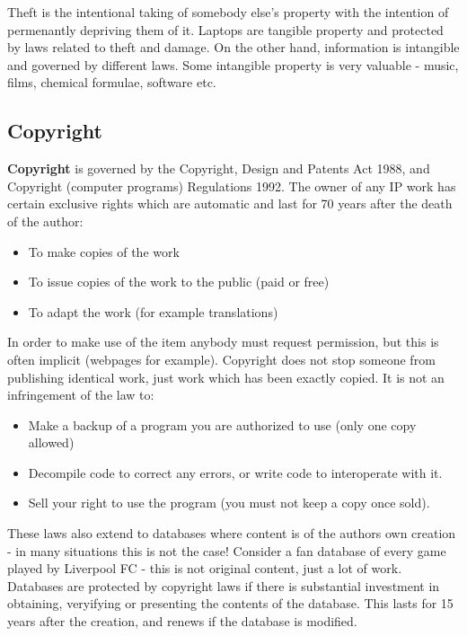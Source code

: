 \documentclass{article}
\begin{document}
	Theft is the intentional taking of somebody else's property with the intention of permenantly depriving them of it. Laptops are tangible property and protected by laws related to theft and damage. On the other hand, information is intangible and governed by different laws. Some intangible property is very valuable - music, films, chemical formulae, software etc.
	
	\subsection{Copyright}
	\textbf{Copyright} is governed by the Copyright, Design and Patents Act 1988, and Copyright (computer programs) Regulations 1992. The owner of any IP work has certain exclusive rights which are automatic and last for 70 years after the death of the author:
	
	\begin{itemize}
	\item To make copies of the work
	\item To issue copies of the work to the public (paid or free)
	\item To adapt the work (for example translations)
	\end{itemize}
	
	In order to make use of the item anybody must request permission, but this is often implicit (webpages for example). Copyright does not stop someone from publishing identical work, just work which has been exactly copied. It is not an infringement of the law to:
	
	\begin{itemize}
	\item Make a backup of a program you are authorized to use (only one copy allowed)
	\item Decompile code to correct any errors, or write code to interoperate with it.
	\item Sell your right to use the program (you must not keep a copy once sold).
	\end{itemize}
	
	These laws also extend to databases where content is of the authors own creation - in many situations this is not the case! Consider a fan database of every game played by Liverpool FC - this is not original content, just a lot of work. Databases are protected by copyright laws if there is substantial investment in obtaining, veryifying or presenting the contents of the database. This lasts for 15 years after the creation, and renews if the database is modified.
	
\end{document}
